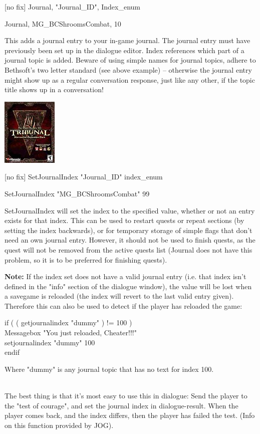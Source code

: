 \documentclass[
]{article}
\begin{document}
{[}no fix{]} Journal, "Journal\_ID", Index\_enum

Journal, MG\_BCShroomsCombat, 10

This adds a journal entry to your in-game journal. The journal entry
must have previously been set up in the dialogue editor. Index
references which part of a journal topic is added. Beware of using
simple names for journal topics, adhere to Bethsoft's two letter
standard (see above example) -- otherwise the journal entry might show
up as a regular conversation response, just like any other, if the topic
title shows up in a conversation!

\includegraphics{media/image6.png}

{[}no fix{]} SetJournalIndex "Journal\_ID" index\_enum

SetJournalIndex "MG\_BCShroomsCombat" 99

SetJournalIndex will set the index to the specified value, whether or
not an entry exists for that index. This can be used to restart quests
or repeat sections (by setting the index backwards), or for temporary
storage of simple flags that don't need an own journal entry. However,
it should not be used to finish quests, as the quest will not be removed
from the active quests list (Journal does not have this problem, so it
is to be preferred for finishing quests).

\textbf{Note:} If the index set does not have a valid journal entry
(i.e. that index isn't defined in the "info" section of the dialogue
window), the value will be lost when a savegame is reloaded (the index
will revert to the last valid entry given). Therefore this can also be
used to detect if the player has reloaded the game:

if ( ( getjournalindex "dummy" ) != 100 )\\
Messagebox "You just reloaded, Cheater!!!"\\
setjournalindex "dummy" 100\\
endif

Where "dummy" is any journal topic that has no text for index 100.\\
\strut \\
The best thing is that it's most easy to use this in dialogue: Send the
player to the "test of courage", and set the journal index in
dialogue-result. When the player comes back, and the index differs, then
the player has failed the test. (Info on this function provided by JOG).
\end{document}
